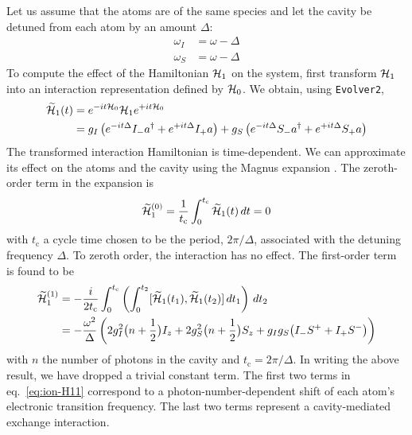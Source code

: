 Let us assume that the atoms are of the same species and let the cavity be detuned from each atom by an amount $\Delta$:
\begin{subequations}
\begin{align}
\omega_I & = \omega - \Delta \\
\omega_S & = \omega - \Delta 
\end{align}
\end{subequations}
To compute the effect of the Hamiltonian ${\cal H}_1$ on the system, first transform ${\cal H}_1$ into an interaction representation defined by ${\cal H}_0$.  We obtain, using \verb+Evolver2+,
\begin{align}
\widetilde{\cal H}_{1}(t)
  & = e^{-i t {\cal H}_0} {\cal H}_1 e^{+i t {\cal H}_0} \\
  & = g_I  \left( e^{-i t \Delta} I_{-} a^{\dagger} + e^{+i t \Delta} I_{+} a \right)
        + g_S \left( e^{-i t \Delta} S_{-} a^{\dagger} + e^{+i t \Delta} S_{+} a \right)
\end{align}
The transformed interaction Hamiltonian is time-dependent.
We can approximate its effect on the atoms and the cavity using the Magnus expansion \cite{Magnus1954nov,Blanes2009jan}.
The zeroth-order term in the expansion is
\begin{equation}
\widetilde{\cal H}_{1}^{(0)}
 = \frac{1}{t_{\mathrm{c}}} \int_{0}^{t_{\mathrm{c}}} \widetilde{\cal H}_{1}(t) \, dt = 0
\end{equation}
with $t_{\mathrm{c}}$ a cycle time chosen to be the period, $2 \pi \big/ \Delta$, associated with the detuning frequency $
\Delta$.
To zeroth order, the interaction has no effect. 
The first-order term is found to be
\begin{align}
\widetilde{\cal H}_{1}^{(1)}
 & = - \frac{i}{2 t_{\mathrm{c}}} 
    \int_{0}^{t_{\mathrm{c}}}  \left( \int_{0}^{t_2} [\widetilde{\cal H}_{1}(t_1), \widetilde{\cal H}_{1}(t_2)] \, d t_1 \right) \, d t_2 \\
 & = - \frac{\omega^2}{\Delta} 
 \left( 
   2 g_I^2 \big( n + \frac{1}{2} \big) I_z 
   + 2 g_S^2 \big( n + \frac{1}{2} \big) S_z 
   + g_I g_S \big( I_{-} S^{+} + I_{+} S^{-} \big)
 \right)
 \label{eq:ion-H11}
\end{align}
with $n$ the number of photons in the cavity and $t_{\mathrm{c}} = 2 \pi \big/ \Delta$.
In writing the above result, we have dropped a trivial constant term.
The first two terms in eq.~\ref{eq:ion-H11} correspond to a photon-number-dependent shift of each atom's electronic transition frequency.
The last two terms represent a cavity-mediated exchange interaction.
